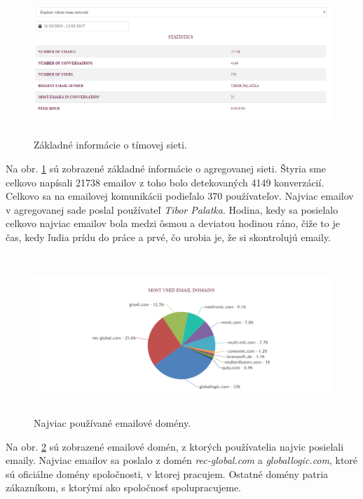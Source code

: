 \documentclass[slovak,master,public,dept460,male,cpdeclaration,oneside]{diploma}
\begin{document}
\begin{figure}[H]
\centering
\includegraphics[width=14cm, height=5.5cm]{figures/team_tab_celkovo}
\caption{Základné informácie o tímovej sieti.}
\label{team_tab_celkovo}
\end{figure}

Na obr. \ref{team_tab_celkovo} sú zobrazené základné informácie o agregovanej sieti. Štyria sme celkovo napísali 21738 emailov z toho bolo detekovaných 4149 konverzácií. Celkovo sa na emailovej komunikácii podieľalo 370 používateľov. Najviac emailov v agregovanej sade poslal používateľ \textit{Tibor Palatka}. Hodina, kedy sa posielalo celkovo najviac emailov bola medzi ôsmou a deviatou hodinou ráno, čiže to je čas, kedy ľudia prídu do práce a prvé, čo urobia je, že si skontrolujú emaily. 

\begin{figure}[H]
\centering
\includegraphics[width=15cm, height=6cm]{figures/team_domain_celkovo}
\caption{Najviac používané emailové domény.}
\label{team_domain_celkovo}
\end{figure}

Na obr. \ref{team_domain_celkovo} sú zobrazené emailové domén, z ktorých používatelia najvic posielali emaily. Najviac emailov sa poslalo z domén \textit{rec-global.com} a \textit{globallogic.com}, ktoré sú oficiálne domény spoločnosti, v ktorej pracujem. Ostatné domény patria zákazníkom, s ktorými ako spoločnosť spolupracujeme. 
\end{document}
